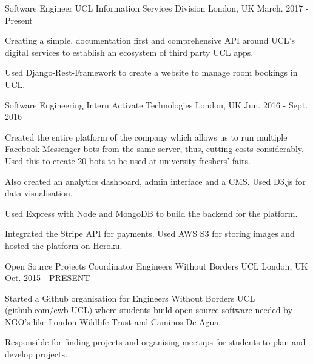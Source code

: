 

\begin{cventries}

\cventry
  {Software Engineer}
  {UCL Information Services Division}
  {London, UK}
  {March. 2017 - Present}
  {
  \begin{cvitems}
    \item {Creating a simple, documentation first and comprehensive API around
    UCL's digital services to establish an ecosystem of third party UCL apps.}
    \item {Used Django-Rest-Framework to create a website to manage room bookings in UCL.}
  \end{cvitems}
  }


\cventry
  {Software Engineering Intern}
  {Activate Technologies}
  {London, UK}
  {Jun. 2016 - Sept. 2016}
  {
    \begin{cvitems}
      \item {Created the entire platform of the company which allows us to run multiple Facebook Messenger bots from the same server, thus, cutting costs considerably. Used this to create 20 bots to be used at university freshers' fairs.}
      \item {Also created an analytics dashboard, admin interface and a CMS. Used D3.js for data visualisation.}
      \item {Used Express with Node and MongoDB to build the backend for the platform.}
      \item{Integrated the Stripe API for payments. Used AWS S3 for storing images and hosted the platform on Heroku.}
    \end{cvitems}
  }

\cventry
  {Open Source Projects Coordinator}
  {Engineers Without Borders UCL}
  {London, UK}
  {Oct. 2015 - PRESENT}
  {
    \begin{cvitems}
      \item {Started a Github organisation for Engineers Without Borders UCL (github.com/ewb-UCL) where students build open source software needed by NGO's like London Wildlife Trust and Caminos De Agua.}
      \item {Responsible for finding projects and organising meetups for students to plan and develop projects.}
    \end{cvitems}
  }

\end{cventries}
